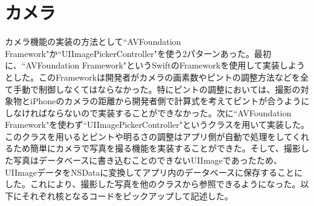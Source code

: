 \section{カメラ}
カメラ機能の実装の方法として``AVFoundation Framework"か``UIImagePickerController"を使う2パターンあった。最初に、``AVFoundation Framework"というSwiftのFrameworkを使用して実装しようとした。このFrameworkは開発者がカメラの画素数やピントの調整方法などを全て手動で制御しなくてはならなかった。特にピントの調整においては、撮影の対象物とiPhoneのカメラの距離から開発者側で計算式を考えてピントが合うようにしなければならないので実装することができなかった。次に``AVFoundation Framework"を使わず``UIImagePickerController"というクラスを用いて実装した。このクラスを用いるとピントや明るさの調整はアプリ側が自動で処理をしてくれるため簡単にカメラで写真を撮る機能を実装することができた。そして、撮影した写真はデータベースに書き込むことのできないUIImageであったため、UIImageデータをNSDataに変換してアプリ内のデータベースに保存することにした。これにより、撮影した写真を他のクラスから参照できるようになった。以下にそれぞれ核となるコードをピックアップして記述した。

